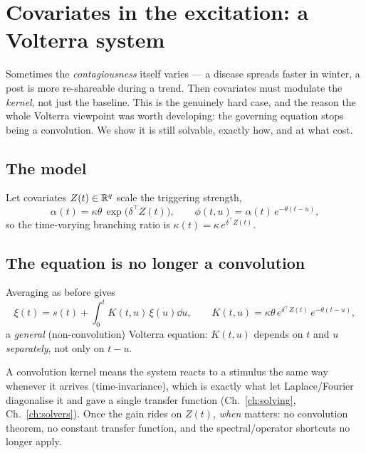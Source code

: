 \chapter{Covariates in the excitation: a Volterra system}
\label{ch:excitation}

\begin{motivation}
Sometimes the \emph{contagiousness} itself varies --- a disease spreads faster in
winter, a post is more re-shareable during a trend. Then covariates must modulate
the \emph{kernel}, not just the baseline. This is the genuinely hard case, and the
reason the whole Volterra viewpoint was worth developing: the governing equation
stops being a convolution. We show it is still solvable, exactly how, and at what
cost.
\end{motivation}

\section{The model}

\begin{model}\label{mod:ch9}
Let covariates $Z(t)\in\mathbb{R}^q$ scale the triggering strength,
\begin{equation}
\alpha_{}(t)=\kappa\theta\,\exp\!\big(\delta^\top Z(t)\big),\qquad
\phi(t,u)=\alpha(t)\,e^{-\theta(t-u)},
\end{equation}
so the time-varying branching ratio is $\kappa(t)=\kappa\,e^{\delta^\top Z(t)}$.
\end{model}

\section{The equation is no longer a convolution}

Averaging as before gives
\begin{equation}
\xi(t)=s(t)+\int_0^t K(t,u)\,\xi(u)\dd u,\qquad
K(t,u)=\kappa\theta\,e^{\delta^\top Z(t)}\,e^{-\theta(t-u)},
\label{eq:ch9-volterra}
\end{equation}
a \emph{general} (non-convolution) Volterra equation: $K(t,u)$ depends on $t$ and
$u$ \emph{separately}, not only on $t-u$.

\begin{whybox}
A convolution kernel means the system reacts to a stimulus the same way whenever it
arrives (time-invariance), which is exactly what let Laplace/Fourier diagonalise
it and gave a single transfer function (Ch.~\ref{ch:solving}, Ch.~\ref{ch:solvers}).
Once the gain rides on $Z(t)$, \emph{when} matters: no convolution theorem, no
constant transfer function, and the spectral/operator shortcuts no longer apply.
\end{whybox}

